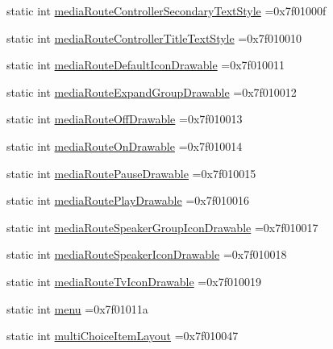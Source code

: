 \begin{DoxyCompactItemize}
\item 
static int \hyperlink{classandroid_1_1support_1_1graphics_1_1drawable_1_1R_1_1attr_a7f101fc6c491bbbb991a0261257d8030}{media\+Route\+Controller\+Secondary\+Text\+Style} =0x7f01000f
\item 
static int \hyperlink{classandroid_1_1support_1_1graphics_1_1drawable_1_1R_1_1attr_a451734bfc57d6a0655eaeaf98e4c6389}{media\+Route\+Controller\+Title\+Text\+Style} =0x7f010010
\item 
static int \hyperlink{classandroid_1_1support_1_1graphics_1_1drawable_1_1R_1_1attr_ab1e54f861857f18597ac6da346251695}{media\+Route\+Default\+Icon\+Drawable} =0x7f010011
\item 
static int \hyperlink{classandroid_1_1support_1_1graphics_1_1drawable_1_1R_1_1attr_a9bf44fc2b67a92b7380371f1a5d9be6e}{media\+Route\+Expand\+Group\+Drawable} =0x7f010012
\item 
static int \hyperlink{classandroid_1_1support_1_1graphics_1_1drawable_1_1R_1_1attr_a0ad945769e4c78fd1ed9fcc7f1a2e09c}{media\+Route\+Off\+Drawable} =0x7f010013
\item 
static int \hyperlink{classandroid_1_1support_1_1graphics_1_1drawable_1_1R_1_1attr_aadbafa9d872f41c8089fa92dea517d5b}{media\+Route\+On\+Drawable} =0x7f010014
\item 
static int \hyperlink{classandroid_1_1support_1_1graphics_1_1drawable_1_1R_1_1attr_af3c9213d00616c39531092c95df0cf8b}{media\+Route\+Pause\+Drawable} =0x7f010015
\item 
static int \hyperlink{classandroid_1_1support_1_1graphics_1_1drawable_1_1R_1_1attr_a637d33488c6e8a97c04407dbd8e05ebd}{media\+Route\+Play\+Drawable} =0x7f010016
\item 
static int \hyperlink{classandroid_1_1support_1_1graphics_1_1drawable_1_1R_1_1attr_af73a9ffd45145444d60810fba4d466c4}{media\+Route\+Speaker\+Group\+Icon\+Drawable} =0x7f010017
\item 
static int \hyperlink{classandroid_1_1support_1_1graphics_1_1drawable_1_1R_1_1attr_a91dd45a9d20abff52cb43846801486ed}{media\+Route\+Speaker\+Icon\+Drawable} =0x7f010018
\item 
static int \hyperlink{classandroid_1_1support_1_1graphics_1_1drawable_1_1R_1_1attr_aba5b655903630f8917a8f1fe207a8733}{media\+Route\+Tv\+Icon\+Drawable} =0x7f010019
\item 
static int \hyperlink{classandroid_1_1support_1_1graphics_1_1drawable_1_1R_1_1attr_a4c5dd08fe2eee37f65519867b1431335}{menu} =0x7f01011a
\item 
static int \hyperlink{classandroid_1_1support_1_1graphics_1_1drawable_1_1R_1_1attr_aeff1e71679ba82412bbeeb5d2afa046f}{multi\+Choice\+Item\+Layout} =0x7f010047

\end{DoxyCompactItemize}
